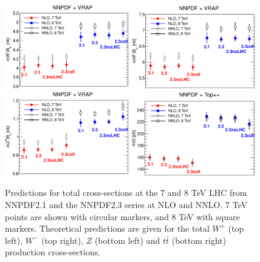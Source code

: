 \begin{figure}[ht]
\centering
\includegraphics[width=0.48\textwidth]{6-LHCimpact/figs/wm.eps}
\includegraphics[width=0.48\textwidth]{6-LHCimpact/figs/wp.eps}
\includegraphics[width=0.48\textwidth]{6-LHCimpact/figs/z.eps}
\includegraphics[width=0.48\textwidth]{6-LHCimpact/figs/tt.eps}
\caption[Predictions for total  $W/Z$ and top production cross-sections at the 7 and 8 TeV LHC]{Predictions for total cross-sections at the 7 and 8 TeV LHC from NNPDF2.1 and the NNPDF2.3 series at NLO and NNLO. 7 TeV points are shown with circular markers, and 8 TeV with square markers. Theoretical predictions are given for the total $W^+$ (top left), $W^-$ (top right), $Z$ (bottom left) and $t\bar{t}$ (bottom right) production cross-sections.}
\label{fig:totalxsecWZt}
\end{figure}

